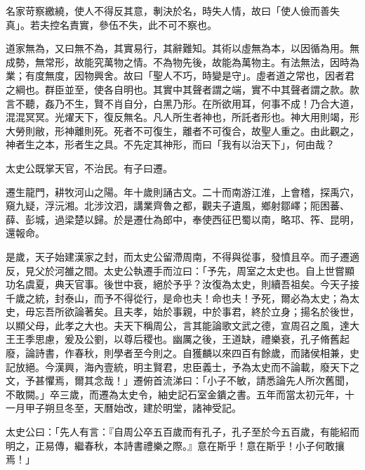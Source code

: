 \begin{pinyinscope}
名家苛察繳繞，使人不得反其意，剸決於名，時失人情，故曰「使人儉而善失真」。若夫控名責實，參伍不失，此不可不察也。

道家無為，又曰無不為，其實易行，其辭難知。其術以虛無為本，以因循為用。無成勢，無常形，故能究萬物之情。不為物先後，故能為萬物主。有法無法，因時為業；有度無度，因物興舍。故曰「聖人不巧，時變是守」。虛者道之常也，因者君之綱也。群臣並至，使各自明也。其實中其聲者謂之端，實不中其聲者謂之款。款言不聽，姦乃不生，賢不肖自分，白黑乃形。在所欲用耳，何事不成！乃合大道，混混冥冥。光燿天下，復反無名。凡人所生者神也，所託者形也。神大用則竭，形大勞則敝，形神離則死。死者不可復生，離者不可復合，故聖人重之。由此觀之，神者生之本，形者生之具。不先定其神形，而曰「我有以治天下」，何由哉？

太史公既掌天官，不治民。有子曰遷。

遷生龍門，耕牧河山之陽。年十歲則誦古文。二十而南游江淮，上會稽，探禹穴，窺九疑，浮沅湘。北涉汶泗，講業齊魯之都，觀夫子遺風，鄉射鄒嶧；阨困蕃、薛、彭城，過梁楚以歸。於是遷仕為郎中，奉使西征巴蜀以南，略邛、筰、昆明，還報命。

是歲，天子始建漢家之封，而太史公留滯周南，不得與從事，發憤且卒。而子遷適反，見父於河雒之間。太史公執遷手而泣曰：「予先，周室之太史也。自上世嘗顯功名虞夏，典天官事。後世中衰，絕於予乎？汝復為太史，則續吾祖矣。今天子接千歲之統，封泰山，而予不得從行，是命也夫！命也夫！予死，爾必為太史；為太史，毋忘吾所欲論著矣。且夫孝，始於事親，中於事君，終於立身；揚名於後世，以顯父母，此孝之大也。夫天下稱周公，言其能論歌文武之德，宣周召之風，達大王王季思慮，爰及公劉，以尊后稷也。幽厲之後，王道缺，禮樂衰，孔子脩舊起廢，論詩書，作春秋，則學者至今則之。自獲麟以來四百有餘歲，而諸侯相兼，史記放絕。今漢興，海內壹統，明主賢君，忠臣義士，予為太史而不論載，廢天下之文，予甚懼焉，爾其念哉！」遷俯首流涕曰：「小子不敏，請悉論先人所次舊聞，不敢闕。」卒三歲，而遷為太史令，紬史記石室金鐀之書。五年而當太初元年，十一月甲子朔旦冬至，天曆始改，建於明堂，諸神受記。

太史公曰：「先人有言：『自周公卒五百歲而有孔子，孔子至於今五百歲，有能紹而明之，正易傳，繼春秋，本詩書禮樂之際。』意在斯乎！意在斯乎！小子何敢攘焉！」


\end{pinyinscope}

